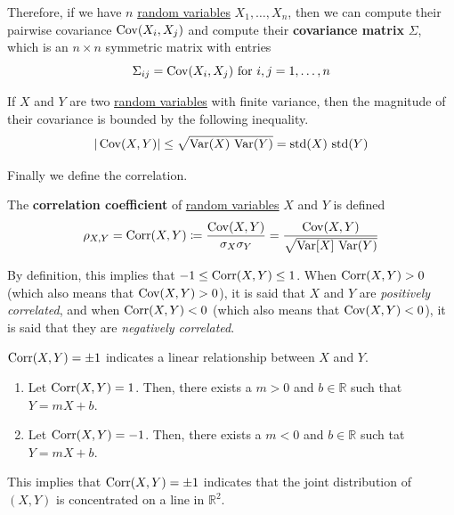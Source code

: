   Therefore, if we have $n$ \hyperref[def:random-variable]{random variables} $X_1, \ldots, X_n$, then we can compute their pairwise covariance $\operatorname{Cov}(X_i, X_j)$ and compute their \textbf{covariance matrix} $\Sigma$, which is an $n \times n$ symmetric matrix with entries 
  \begin{equation}
    \Sigma_{ij} = \operatorname{Cov}(X_i, X_j) \text{ for } i, j = 1, \ldots, n
  \end{equation}

  \begin{theorem}
    \label{thm:simple-bound-on-covariance}
    If $X$ and $Y$ are two \hyperref[def:random-variable]{random variables} with finite variance, then the magnitude of their covariance is bounded by the following inequality. 
    \begin{equation}
      |\operatorname{Cov}(X,Y)| \leq \sqrt{\operatorname{Var}(X) \, \operatorname{Var}(Y)} = \operatorname{std}(X) \, \operatorname{std}(Y)
    \end{equation}
  \end{theorem}

  Finally we define the correlation. 

  \begin{definition}
    \label{def:correlation-coefficient}
    The \textbf{correlation coefficient} of \hyperref[def:random-variable]{random variables} $X$ and $Y$ is defined 
    \begin{equation}
      \rho_{X, Y} = \operatorname{Corr}(X, Y) \coloneqq \frac{\operatorname{Cov}(X, Y)}{\sigma_X \sigma_Y} = \frac{\operatorname{Cov}(X, Y)}{\sqrt{\operatorname{Var}[X] \, \operatorname{Var}(Y)}}
    \end{equation}
  \end{definition}

  By definition, this implies that $-1 \leq \operatorname{Corr}(X, Y) \leq 1$. When $\operatorname{Corr}(X, Y) > 0$ (which also means that $\operatorname{Cov}(X, Y) > 0$), it is said that $X$ and $Y$ are \textit{positively correlated}, and when $\operatorname{Corr}(X, Y) < 0$ (which also means that $\operatorname{Cov}(X, Y) < 0$), it is said that they are \textit{negatively correlated}. 

  \begin{theorem}
    \label{thm:correlation-pm1-characterizes-linear-dependence}
    $\operatorname{Corr}(X,Y) = \pm 1$ indicates a linear relationship between $X$ and $Y$. 
    \begin{enumerate}
      \item Let $\operatorname{Corr}(X, Y) = 1$. Then, there exists a $m>0$ and $b \in \mathbb{R}$ such that $Y = m X + b$. 
      \item Let $\operatorname{Corr}(X, Y) = -1$. Then, there exists a $m<0$ and $b \in \mathbb{R}$ such tat $Y = m X + b$. 
    \end{enumerate}
    This implies that $\operatorname{Corr}(X, Y) = \pm 1$ indicates that the joint distribution of $(X, Y)$ is concentrated on a line in $\mathbb{R}^2$. 
  \end{theorem}

